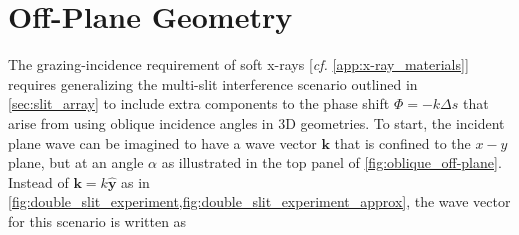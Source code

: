 \section{Off-Plane Geometry}\label{sec:off-plane_geo}
The grazing-incidence requirement of soft x-rays [\emph{cf.\@} \cref{app:x-ray_materials}] requires generalizing the multi-slit interference scenario outlined in \cref{sec:slit_array} to include extra components to the phase shift $\Phi = - k \Delta s$ that arise from using oblique incidence angles in 3D geometries. 
To start, the incident plane wave can be imagined to have a wave vector $\mathbold{k}$ that is confined to the $x-y$ plane, but at an angle $\alpha$ as illustrated in the top panel of \cref{fig:oblique_off-plane}. 
Instead of $\mathbold{k} = k \mathbold{\hat{y}}$ as in \cref{fig:double_slit_experiment,fig:double_slit_experiment_approx}, the wave vector for this scenario is written as 
